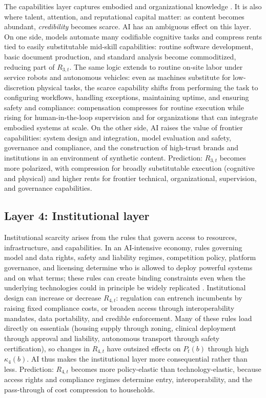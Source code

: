 \documentclass[11pt]{article}
\begin{document}
The capabilities layer captures embodied and organizational knowledge \citep[e.g.][]{Becker1993HumanCapital,NelsonWinter1982}. It is also where talent, attention, and reputational capital matter: as content becomes abundant, \emph{credibility} becomes scarce. AI has an ambiguous effect on this layer. On one side, models automate many codifiable cognitive tasks and compress rents tied to easily substitutable mid-skill capabilities: routine software development, basic document production, and standard analysis become commoditized, reducing part of \(R_{3,t}\). The same logic extends to routine on-site labor under service robots and autonomous vehicles: even as machines substitute for low-discretion physical tasks, the scarce capability shifts from performing the task to configuring workflows, handling exceptions, maintaining uptime, and ensuring safety and compliance: compensation compresses for routine execution while rising for human-in-the-loop supervision and for organizations that can integrate embodied systems at scale. On the other side, AI raises the value of frontier capabilities: system design and integration, model evaluation and safety, governance and compliance, and the construction of high-trust brands and institutions in an environment of synthetic content. Prediction: \(R_{3,t}\) becomes more polarized, with compression for broadly substitutable execution (cognitive and physical) and higher rents for frontier technical, organizational, supervision, and governance capabilities.

\subsection{Layer 4: Institutional layer}

Institutional scarcity arises from the rules that govern access to resources, infrastructure, and capabilities. In an AI-intensive economy, rules governing model and data rights, safety and liability regimes, competition policy, platform governance, and licensing determine who is allowed to deploy powerful systems and on what terms; these rules can create binding constraints even when the underlying technologies could in principle be widely replicated \citep[e.g.][]{North1990Institutions,AcemogluRobinson2012}. Institutional design can increase or decrease \(R_{4,t}\): regulation can entrench incumbents by raising fixed compliance costs, or broaden access through interoperability mandates, data portability, and credible enforcement. Many of these rules load directly on essentials (housing supply through zoning, clinical deployment through approval and liability, autonomous transport through safety certification), so changes in \(R_{4,t}\) have outsized effects on \(P_t(b)\) through high \(\kappa_4(b)\). AI thus makes the institutional layer more consequential rather than less. Prediction: \(R_{4,t}\) becomes more policy-elastic than technology-elastic, because access rights and compliance regimes determine entry, interoperability, and the pass-through of cost compression to households.
\end{document}
